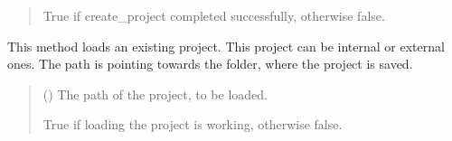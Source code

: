 \documentclass[letterpaper,10pt,english]{sphinxmanual}
\begin{document}
\begin{fulllineitems}
\begin{fulllineitems}
\begin{quote}
\begin{description}
\begin{itemize}
\end{itemize}

\sphinxAtStartPar
True if create\_project completed successfully, otherwise false.

\sphinxAtStartPar
{}

\end{description}\end{quote}

\end{fulllineitems}


\begin{fulllineitems}
\label{\detokenize{apidoc/src.osm_configurator.model.application:src.osm_configurator.model.application.application_interface.IApplication.load_project}}
\pysigstartsignatures
{}
\pysigstopsignatures
\sphinxAtStartPar
This method loads an existing project. This project can be internal or external ones. The path is pointing
towards the folder, where the project is saved.
\begin{quote}\begin{description}
\sphinxAtStartPar
{} () \textendash{} The path of the project, to be loaded.

\sphinxAtStartPar
True if loading the project is working, otherwise false.

\sphinxAtStartPar
{}

\end{description}\end{quote}

\end{fulllineitems}



\end{fulllineitems}
\end{document}
